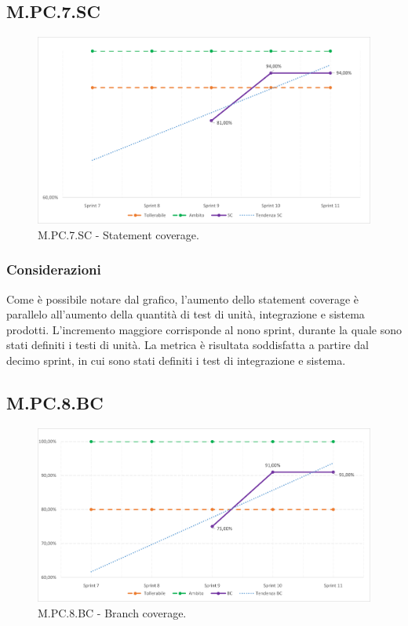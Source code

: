 \documentclass[10pt, a4paper]{article}
\begin{document}
\subsection{M.PC.7.SC}
\begin{figure}[H]
\includegraphics[width=15.5cm]{img/metriche/MPC7SC.png}
\caption{M.PC.7.SC - Statement coverage.}
\end{figure}
\subsubsection{Considerazioni}
Come è possibile notare dal grafico, l'aumento dello statement coverage è parallelo all'aumento della quantità di test di unità, integrazione e sistema prodotti. L'incremento maggiore corrisponde al nono sprint, durante la quale sono stati definiti i testi di unità. La metrica è risultata soddisfatta a partire dal decimo sprint, in cui sono stati definiti i test di integrazione e sistema.

\subsection{M.PC.8.BC}
\begin{figure}[H]
\includegraphics[width=15.5cm]{img/metriche/MPC8BC.png}
\caption{M.PC.8.BC - Branch coverage.}
\end{figure}
\end{document}
